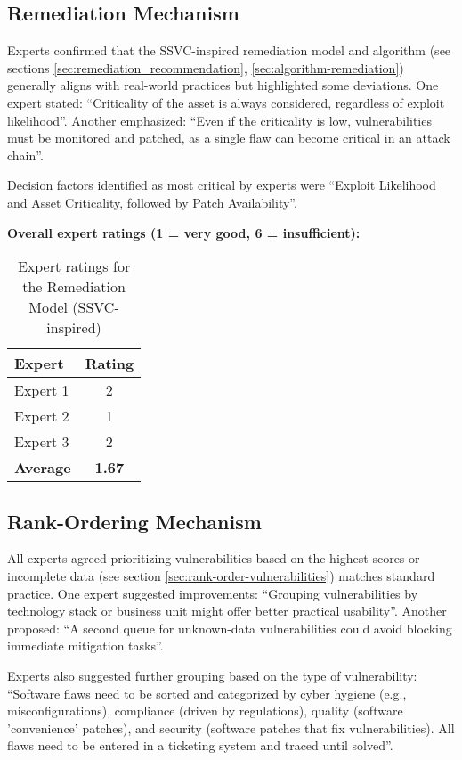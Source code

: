 \subsection{Remediation Mechanism}

Experts confirmed that the \ac{SSVC}-inspired remediation model and algorithm (see sections \ref{sec:remediation_recommendation}, \ref{sec:algorithm-remediation}) generally aligns with real-world practices but highlighted some deviations. One expert stated: \enquote{Criticality of the asset is always considered, regardless of exploit likelihood}. Another emphasized: \enquote{Even if the criticality is low, vulnerabilities must be monitored and patched, as a single flaw can become critical in an attack chain}.

Decision factors identified as most critical by experts were \enquote{Exploit Likelihood and Asset Criticality, followed by Patch Availability}.

\textbf{Overall expert ratings (1 = very good, 6 = insufficient):}
\\
\begin{table}[H]
\centering
\begin{tabular}{|l|c|}
    \hline
    Expert & Rating \\
    \hline
    Expert 1 & 2 \\
    Expert 2 & 1 \\
    Expert 3 & 2 \\
    \hline
    \textbf{Average} & \textbf{1.67} \\
    \hline
\end{tabular}
\caption{Expert ratings for the Remediation Model (\ac{SSVC}-inspired)}
\label{tab:expert_ratings_remediation_ssvc}
\end{table}

\subsection{Rank-Ordering Mechanism}

All experts agreed prioritizing vulnerabilities based on the highest scores or incomplete data (see section \ref{sec:rank-order-vulnerabilities}) matches standard practice. One expert suggested improvements: \enquote{Grouping vulnerabilities by technology stack or business unit might offer better practical usability}. Another proposed: \enquote{A second queue for unknown-data vulnerabilities could avoid blocking immediate mitigation tasks}.

Experts also suggested further grouping based on the type of vulnerability: \enquote{Software flaws need to be sorted and categorized by cyber hygiene (e.g., misconfigurations), compliance (driven by regulations), quality (software 'convenience' patches), and security (software patches that fix vulnerabilities). All flaws need to be entered in a ticketing system and traced until solved}.

